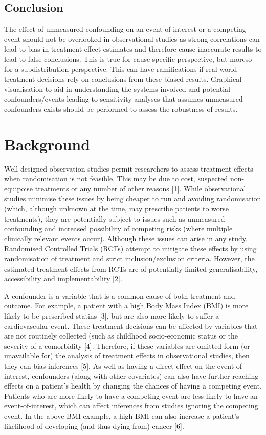\documentclass[
]{article}
\begin{document}
\hypertarget{conclusion}{%
\subsection{Conclusion}\label{conclusion}}

The effect of unmeasured confounding on an event-of-interest or a competing event should not be overlooked in observational studies as strong correlations can lead to bias in treatment effect estimates and therefore cause inaccurate results to lead to false conclusions. This is true for cause specific perspective, but moreso for a subdistribution perspective. This can have ramifications if real-world treatment decisions rely on conclusions from these biased results. Graphical visualisation to aid in understanding the systems involved and potential confounders/events leading to sensitivity analyses that assumes unmeasured confounders exists should be performed to assess the robustness of results.

\hypertarget{background-1}{%
\section{Background}\label{background-1}}

Well-designed observation studies permit researchers to assess treatment effects when randomisation is not feasible. This may be due to cost, suspected non-equipoise treatments or any number of other reasons {[}1{]}. While observational studies minimise these issues by being cheaper to run and avoiding randomisation (which, although unknown at the time, may prescribe patients to worse treatments), they are potentially subject to issues such as unmeasured confounding and increased possibility of competing risks (where multiple clinically relevant events occur). Although these issues can arise in any study, Randomised Controlled Trials (RCTs) attempt to mitigate these effects by using randomisation of treatment and strict inclusion/exclusion criteria. However, the estimated treatment effects from RCTs are of potentially limited generalisability, accessibility and implementability {[}2{]}.

A confounder is a variable that is a common cause of both treatment and outcome. For example, a patient with a high Body Mass Index (BMI) is more likely to be prescribed statins {[}3{]}, but are also more likely to suffer a cardiovascular event. These treatment decisions can be affected by variables that are not routinely collected (such as childhood socio-economic status or the severity of a comorbidity {[}4{]}. Therefore, if these variables are omitted form (or unavailable for) the analysis of treatment effects in observational studies, then they can bias inferences {[}5{]}. As well as having a direct effect on the event-of-interest, confounders (along with other covariates) can also have further reaching effects on a patient's health by changing the chances of having a competing event. Patients who are more likely to have a competing event are less likely to have an event-of-interest, which can affect inferences from studies ignoring the competing event. In the above BMI example, a high BMI can also increase a patient's likelihood of developing (and thus dying from) cancer {[}6{]}.
\end{document}
